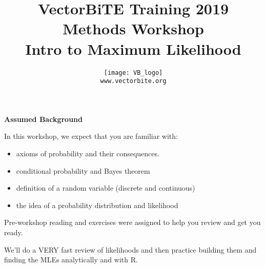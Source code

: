 \documentclass[12pt,xcolor=svgnames]{beamer}
\newcommand{\rd}{\color{red}}
\newcommand{\org}{\color{Orange}}
\newcommand{\gr}{\color{gray}}
\newcommand{\theme}{\color{FireBrick}}
\newcommand{\sk}{\vspace{.4cm}}
\newcommand{\chap}[1]{{\theme \Large \bf #1} \sk}
\begin{document}
{ \usebackgroundtemplate{}%
\thispagestyle{empty}
\setcounter{page}{0}


\title{\theme \Large \vskip 0.5cm
{\bf VectorBiTE Training 2019 \\ Methods Workshop}\\
\bigskip
\bf {\sf \gr Intro to Maximum Likelihood}}

\author{
\begin{center}
\texttt{[image: VB\_logo]}
\end{center}
\texttt{\rd\small www.vectorbite.org}
}
\date{}
\maketitle 
}



\begin{frame}
\chap{Assumed Background} 

In this workshop, we expect that you are familiar with:

\begin{itemize}
\item axioms of probability and their consequences.
\item conditional probability and Bayes theorem
\item definition of a random variable (discrete and continuous)
\item the idea of a probability distribution and likelihood
\end{itemize}

Pre-workshop reading and exercises were assigned to help you review and get you ready.

\bigskip

We'll do a VERY fast review of likelihoods and then practice building them and finding the MLEs analytically and with {\sf R}.


\end{frame}
\end{document}
